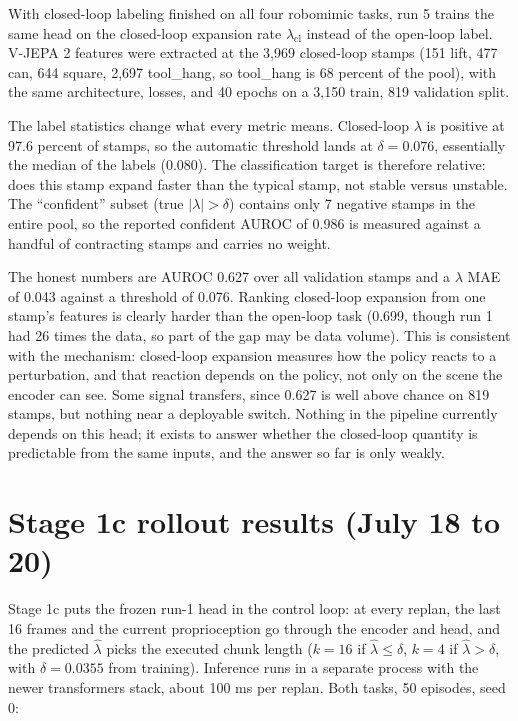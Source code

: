 \documentclass[11pt]{article}
\begin{document}
With closed-loop labeling finished on all four robomimic tasks, run 5 trains the
same head on the closed-loop expansion rate $\lambda_{\mathrm{cl}}$ instead of
the open-loop label. V-JEPA 2 features were extracted at the 3{,}969 closed-loop
stamps (151 lift, 477 can, 644 square, 2{,}697 tool\_hang, so tool\_hang is 68
percent of the pool), with the same architecture, losses, and 40 epochs on a
3{,}150 train, 819 validation split.

The label statistics change what every metric means. Closed-loop $\lambda$ is
positive at 97.6 percent of stamps, so the automatic threshold lands at
$\delta = 0.076$, essentially the median of the labels (0.080). The
classification target is therefore relative: does this stamp expand faster than
the typical stamp, not stable versus unstable. The ``confident'' subset (true
$|\lambda| > \delta$) contains only 7 negative stamps in the entire pool, so the
reported confident AUROC of 0.986 is measured against a handful of contracting
stamps and carries no weight.

The honest numbers are AUROC 0.627 over all validation stamps and a $\lambda$
MAE of 0.043 against a threshold of 0.076. Ranking closed-loop expansion from
one stamp's features is clearly harder than the open-loop task (0.699, though
run 1 had 26 times the data, so part of the gap may be data volume). This is
consistent with the mechanism: closed-loop expansion measures how the policy
reacts to a perturbation, and that reaction depends on the policy, not only on
the scene the encoder can see. Some signal transfers, since 0.627 is well above
chance on 819 stamps, but nothing near a deployable switch. Nothing in the
pipeline currently depends on this head; it exists to answer whether the
closed-loop quantity is predictable from the same inputs, and the answer so far
is only weakly.

\section{Stage 1c rollout results (July 18 to 20)}
\label{sec:stage1c}

Stage 1c puts the frozen run-1 head in the control loop: at every replan, the last
16 frames and the current proprioception go through the encoder and head, and the
predicted $\hat\lambda$ picks the executed chunk length ($k{=}16$ if
$\hat\lambda \leq \delta$, $k{=}4$ if $\hat\lambda > \delta$, with
$\delta = 0.0355$ from training). Inference runs in a separate process with the
newer transformers stack, about 100 ms per replan. Both tasks, 50 episodes,
seed 0:
\end{document}

